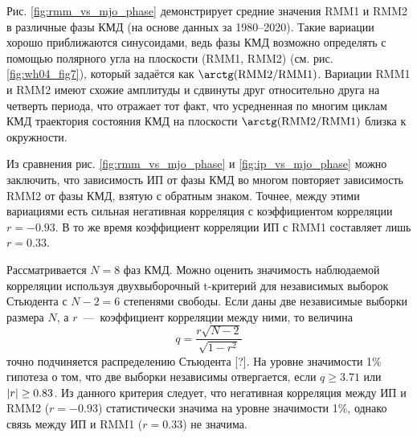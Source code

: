 Рис. \ref{fig:rmm_vs_mjo_phase} демонстрирует средние значения RMM1 и RMM2 в различные фазы КМД (на основе данных за 1980--2020). Такие вариации хорошо приближаются синусоидами, ведь фазы КМД возможно определять с помощью полярного угла на плоскости (RMM1, RMM2) (см. рис. \ref{fig:wh04_fig7}), который задаётся как $\arctg(\mathrm{RMM2}/\mathrm{RMM1})$. Вариации RMM1 и RMM2 имеют схожие амплитуды и сдвинуты друг относительно друга на четверть периода, что отражает тот факт, что усредненная по многим циклам КМД траектория состояния КМД на плоскости $\arctg(\mathrm{RMM2}/\mathrm{RMM1})$ близка к окружности.

Из сравнения рис. \ref{fig:rmm_vs_mjo_phase} и \ref{fig:ip_vs_mjo_phase} можно заключить, что зависимость ИП от фазы КМД во многом повторяет зависимость RMM2 от фазы КМД, взятую с обратным знаком. Точнее, между этими вариациями есть сильная негативная корреляция с коэффициентом корреляции $r=-0.93$. В то же время коэффициент корреляции ИП с RMM1 составляет лишь $r=0.33$.

Рассматривается $N = 8$ фаз КМД. Можно оценить значимость наблюдаемой корреляции используя двухвыборочный t-критерий для независимых выборок Стьюдента с $N - 2 = 6$ степенями свободы. Если даны две независимые выборки размера $N$, а $r$~---~коэффициент корреляции между ними, то величина
\begin{equation}
 	q = \dfrac{r\sqrt{N-2}}{\sqrt{1-r^2}}
\end{equation}
точно подчиняется распределению Стьюдента [?]. На уровне значимости 1\% гипотеза о том, что две выборки независимы отвергается, если $q\ge3.71$ или $\abs{r}\ge0.83$. Из данного критерия следует, что негативная корреляция между ИП и RMM2 ($r=-0.93$) статистически значима на уровне значимости 1\%, однако связь между ИП и RMM1 ($r=0.33$) не значима.

